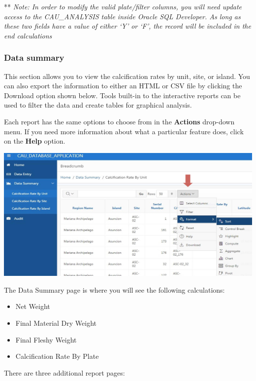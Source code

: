 \documentclass[
]{book}
\providecommand{\tightlist}{%
  \setlength{\itemsep}{0pt}\setlength{\parskip}{0pt}}
\begin{document}
** \emph{Note: In order to modify the valid plate/filter columns, you will need update access to the CAU\_ANALYSIS table inside Oracle SQL Developer. As long as these two fields have a value of either `Y' or `F', the record will be included in the end calculations}

\hypertarget{data-summary}{%
\subsubsection{Data summary}\label{data-summary}}

This section allows you to view the calcification rates by unit, site, or island. You can also export the information to either an HTML or CSV file by clicking the Download option shown below. Tools built-in to the interactive reports can be used to filter the data and create tables for graphical analysis.

Each report has the same options to choose from in the \textbf{Actions} drop-down menu. If you need more information about what a particular feature does, click on the \textbf{Help} option.

\includegraphics{images/Data7.jpg}

The Data Summary page is where you will see the following calculations:

\begin{itemize}
\tightlist
\item
  Net Weight\\
\item
  Final Material Dry Weight\\
\item
  Final Fleshy Weight\\
\item
  Calcification Rate By Plate
\end{itemize}

There are three additional report pages:
\end{document}
